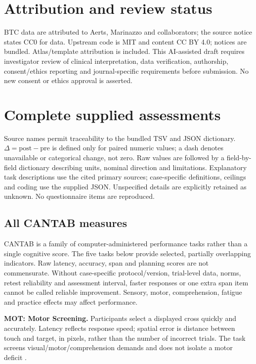 \documentclass[11pt,a4paper]{article}
\begin{document}
\section*{Attribution and review status}
BTC data are attributed to Aerts, Marinazzo and collaborators; the source notice states CC0 for data. Upstream code is MIT and content CC BY 4.0; notices are bundled. Atlas/template attribution is included. This AI-assisted draft requires investigator review of clinical interpretation, data verification, authorship, consent/ethics reporting and journal-specific requirements before submission. No new consent or ethics approval is asserted.
\nocite{preopdata,postopdata}\begingroup\small{}\setlength{\bibsep}{2pt}\endgroup
\clearpage\appendix
\section{Complete supplied assessments}\label{app:all}
Source names permit traceability to the bundled TSV and JSON dictionary. $\Delta=\mathrm{post}-\mathrm{pre}$ is defined only for paired numeric values; a dash denotes unavailable or categorical change, not zero. Raw values are followed by a field-by-field dictionary describing units, nominal direction and limitations. Explanatory task descriptions use the cited primary sources; case-specific definitions, ceilings and coding use the supplied JSON. Unspecified details are explicitly retained as unknown. No questionnaire items are reproduced.

\subsection{All CANTAB measures}\label{app:cantab}
CANTAB is a family of computer-administered performance tasks rather than a single cognitive score. The five tasks below provide selected, partially overlapping indicators. Raw latency, accuracy, span and planning scores are not commensurate. Without case-specific protocol/version, trial-level data, norms, retest reliability and assessment interval, faster responses or one extra span item cannot be called reliable improvement. Sensory, motor, comprehension, fatigue and practice effects may affect performance.

\textbf{MOT: Motor Screening.} Participants select a displayed cross quickly and accurately. Latency reflects response speed; spatial error is distance between touch and target, in pixels, rather than the number of incorrect trials. The task screens visual/motor/comprehension demands and does not isolate a motor deficit \citep{cantabmot}.
\end{document}

